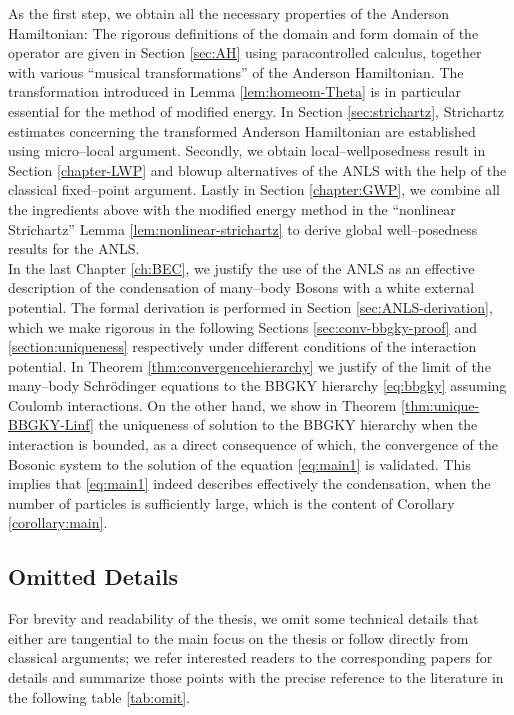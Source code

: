 As the first step, we obtain all the necessary properties of the Anderson Hamiltonian: The rigorous definitions of the domain and form domain of the operator are given in Section \ref{sec:AH} using paracontrolled calculus, together with various ``musical transformations'' of the Anderson Hamiltonian. The transformation introduced in Lemma \ref{lem:homeom-Theta} is in particular essential for the method of modified energy. In Section \ref{sec:strichartz}, Strichartz estimates concerning the transformed Anderson Hamiltonian are established using micro--local argument. Secondly, we obtain local--wellposedness result in Section \ref{chapter-LWP} and blowup alternatives of the ANLS with the help of the classical fixed--point argument. Lastly in Section \ref{chapter:GWP}, we combine all the ingredients above with the modified energy method in the ``nonlinear Strichartz'' Lemma \ref{lem:nonlinear-strichartz} to derive global well--posedness results for the ANLS. \\

In the last Chapter \ref{ch:BEC}, we justify the use of the ANLS as an effective description of the condensation of many--body Bosons with a white external potential. The formal derivation is performed in Section \ref{sec:ANLS-derivation}, which we make rigorous in the following Sections
\ref{sec:conv-bbgky-proof} and \ref{section:uniqueness} respectively under
different conditions of the interaction potential. In Theorem
\ref{thm:convergencehierarchy} we justify of the limit of the many--body Schrödinger equations to
the BBGKY hierarchy \eqref{eq:bbgky} assuming Coulomb interactions. On the other hand, we show in Theorem \ref{thm:unique-BBGKY-Linf} the uniqueness of
solution to the BBGKY hierarchy when the interaction is bounded, as
a direct consequence of which, the convergence of the Bosonic system to the
solution of the equation \eqref{eq:main1} is validated. This implies that
\eqref{eq:main1} indeed describes effectively the condensation, when the number of particles is
sufficiently large, which is the content of Corollary \ref{corollary:main}.
\subsection*{Omitted Details}
For brevity and readability of the thesis, we omit some technical details that either are tangential to the main focus on the thesis or follow directly from classical arguments; we refer interested readers to the corresponding papers for details and summarize those points with the precise reference to the literature in the following table \ref{tab:omit}. \\

